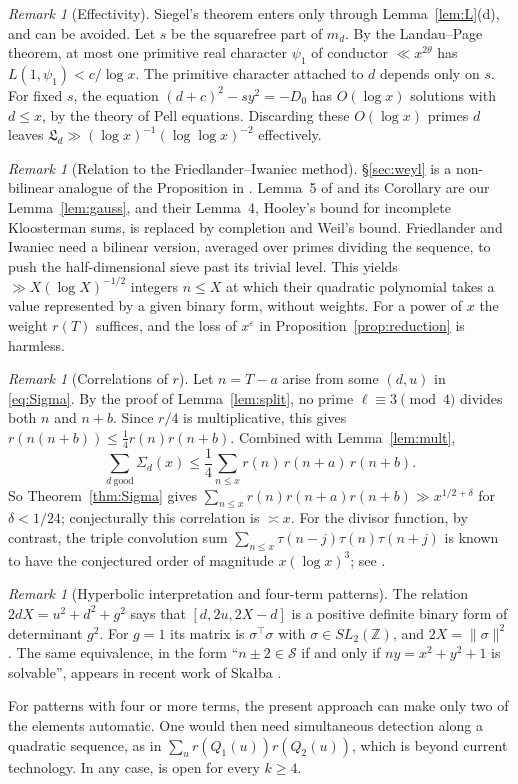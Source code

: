 \documentclass[11pt]{amsart}
\theoremstyle{remark}
\newtheorem{remark}[theorem]{Remark}
\theoremstyle{definition}
\numberwithin{equation}{section}
\newcommand{\Sc}{\mathcal{S}}
\newcommand{\Z}{\mathbb{Z}}
\newcommand{\eps}{\varepsilon}
\newcommand{\Lf}{\mathfrak{L}}
\begin{document}
\begin{remark}[Effectivity]\label{rem:effective}
Siegel's theorem enters only through Lemma~\ref{lem:L}(d), and can be avoided. Let $s$ be the squarefree part of $m_d$. By the Landau--Page theorem, at most one primitive real character $\psi_1$ of conductor $\ll x^{2\theta}$ has $L(1,\psi_1)<c/\log x$. The primitive character attached to $d$ depends only on $s$. For fixed $s$, the equation $(d+c)^2-sy^2=-D_0$ has $O(\log x)$ solutions with $d\le x$, by the theory of Pell equations. Discarding these $O(\log x)$ primes $d$ leaves $\Lf_d\gg(\log x)^{-1}(\log\log x)^{-2}$ effectively.
\end{remark}

\begin{remark}[Relation to the Friedlander--Iwaniec method]
\S\ref{sec:weyl} is a non-bilinear analogue of the Proposition in \cite[\S4]{FI78}. Lemma~5 of \cite{FI78} and its Corollary are our Lemma~\ref{lem:gauss}, and their Lemma~4, Hooley's bound for incomplete Kloosterman sums, is replaced by completion and Weil's bound. Friedlander and Iwaniec need a bilinear version, averaged over primes dividing the sequence, to push the half-dimensional sieve past its trivial level. This yields $\gg X(\log X)^{-1/2}$ integers $n\le X$ at which their quadratic polynomial takes a value represented by a given binary form, without weights. For a power of $x$ the weight $r(T)$ suffices, and the loss of $x^{\eps}$ in Proposition~\ref{prop:reduction} is harmless.
\end{remark}

\begin{remark}[Correlations of $r$]\label{rem:correlation}
Let $n=T-a$ arise from some $(d,u)$ in \eqref{eq:Sigma}. By the proof of Lemma~\ref{lem:split}, no prime $\ell\equiv3\pmod4$ divides both $n$ and $n+b$. Since $r/4$ is multiplicative, this gives $r(n(n+b))\le\frac14r(n)r(n+b)$. Combined with Lemma~\ref{lem:mult},
\[
\sum_{d\ \mathrm{good}}\Sigma_d(x)\le\frac14\sum_{n\le x}r(n)\,r(n+a)\,r(n+b).
\]
So Theorem~\ref{thm:Sigma} gives $\sum_{n\le x}r(n)r(n+a)r(n+b)\gg x^{1/2+\delta}$ for $\delta<1/24$; conjecturally this correlation is $\asymp x$. For the divisor function, by contrast, the triple convolution sum $\sum_{n\le x}\tau(n-j)\tau(n)\tau(n+j)$ is known to have the conjectured order of magnitude $x(\log x)^3$; see \cite{MMS}.
\end{remark}

\begin{remark}[Hyperbolic interpretation and four-term patterns]
The relation $2dX=u^2+d^2+g^2$ says that $[d,2u,2X-d]$ is a positive definite binary form of determinant $g^2$. For $g=1$ its matrix is $\sigma^{\top}\sigma$ with $\sigma\in SL_2(\Z)$, and $2X=\|\sigma\|^2$. The same equivalence, in the form ``$n\pm2\in\Sc$ if and only if $ny=x^2+y^2+1$ is solvable'', appears in recent work of Ska{\l}ba \cite{Sk}.

For patterns with four or more terms, the present approach can make only two of the elements automatic. One would then need simultaneous detection along a quadratic sequence, as in $\sum_u r(Q_1(u))r(Q_2(u))$, which is beyond current technology. In any case, \cite[Conjecture~2.1]{FKR} is open for every $k\ge4$.
\end{remark}
\end{document}
